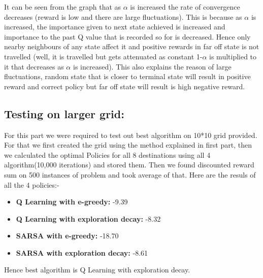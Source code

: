 \documentclass{article}
\begin{document}
\begin{enumerate}[a)]
\begin{enumerate}
    It can be seen from the graph that as $\alpha$ is increased the rate of convergence decreases (reward is low and there are large fluctuations). This is because as $\alpha$ is 
    increased, the importance given to next state achieved is increased and importance to the past Q value that is recorded so for is decreased. Hence only nearby neighbours of any 
    state affect it and positive rewards in far off state is not travelled (well, it is travelled but gets attenuated as constant 1-$\alpha$ is multiplied to it that decreases as $\alpha$ is increased).
    This also explains the reason of large fluctuations, random state that is closer to terminal state will result in positive reward and correct policy but far off state will result is high negative reward.

\end{enumerate}


\subsection{Testing on larger grid:}
For this part we were required to test out best algorithm on 10*10 grid provided. For that we first created the grid using the method explained in first part, then we calculated the optimal Policies for all 8 destinations using all 4 algorithm(10,000 iterations) and stored them. Then we found discounted reward sum on 500 instances of problem and took average of that.
Here are the resuls of all the 4 policies:- 
\begin{itemize}
    \item \textbf{Q Learning with e-greedy: } -9.39
    \item \textbf{Q Learning with exploration decay: }  -8.32
    \item \textbf{SARSA with e-greedy: }  -18.70
    \item \textbf{SARSA with exploration decay: } -8.61
\end{itemize}

Hence best algorithm is Q Learning with exploration decay.

\end{enumerate}
\end{document}
